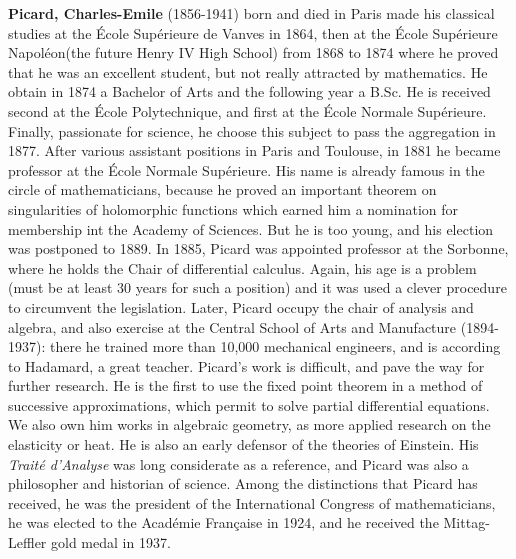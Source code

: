 \textbf{Picard, Charles-Emile }(1856-1941) born and died in Paris made his classical studies at the  École Supérieure de Vanves in 1864, then at the École Supérieure Napoléon(the future Henry IV High School) from 1868 to 1874 where he proved that he was an excellent student, but not really attracted by mathematics. He obtain in 1874 a Bachelor of Arts and the following year a B.Sc. He is received second at the École Polytechnique, and first at the École Normale Supérieure. Finally, passionate for science, he choose this subject to pass the aggregation in 1877. After various assistant positions in Paris and Toulouse, in 1881 he became professor at the École Normale Supérieure. His name is already famous in the circle of mathematicians, because he proved an important theorem on singularities of holomorphic functions which earned him a nomination for membership int the Academy of Sciences. But he is too young, and his election was postponed to 1889. In 1885, Picard was appointed professor at the Sorbonne, where he holds the Chair of differential calculus. Again, his age is a problem (must be at least 30 years for such a position) and it was used a clever procedure to circumvent the legislation. Later, Picard occupy the chair of analysis and algebra, and also exercise at the Central School of Arts and Manufacture (1894-1937): there he trained more than 10,000 mechanical engineers, and is according to Hadamard, a great teacher. Picard's work is difficult, and pave the way for further research. He is the first to use the fixed point theorem in a method of successive approximations, which permit to solve partial differential equations. We also own him works in algebraic geometry, as more applied research on the elasticity or heat. He is also an early defensor of the theories of Einstein. His \textit{Traité d'Analyse} was long considerate as a reference, and Picard was also a philosopher and historian of science. Among the distinctions that Picard has received, he was the president of the International Congress of mathematicians, he was elected to the Académie Française in 1924, and he received the Mittag-Leffler gold medal in 1937.

